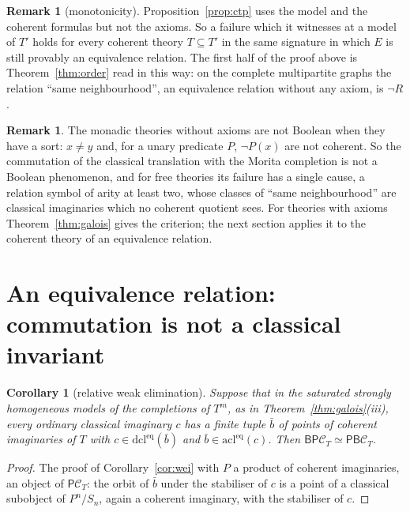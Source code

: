 \documentclass[11pt]{amsart}
\newtheorem{cor}[thm]{Corollary}
\theoremstyle{definition}
\newtheorem{rem}[thm]{Remark}
\newcommand{\PP}{\mathsf P}
\newcommand{\BB}{\mathsf B}
\newcommand{\cC}{\mathcal C}
\begin{document}
\begin{rem}[monotonicity]\label{rem:mono}
Proposition~\ref{prop:ctp} uses the model and the coherent formulas but
not the axioms. So a failure which it witnesses at a model of $T'$
holds for every coherent theory $T\subseteq T'$ in the same signature
in which $E$ is still provably an equivalence relation. The first half
of the proof above is Theorem~\ref{thm:order} read in this way: on the
complete multipartite graphs the relation ``same neighbourhood'', an
equivalence relation without any axiom, is $\neg R$.
\end{rem}

\begin{rem}
The monadic theories without axioms are not Boolean when they have a
sort: $x\ne y$
and, for a unary predicate $P$, $\neg P(x)$ are not coherent. So the commutation of the classical
translation with the Morita completion is not a Boolean phenomenon, and
for free theories its failure has a single cause, a relation symbol of arity
at least two, whose classes of ``same neighbourhood'' are classical imaginaries
which no coherent quotient sees. For theories with axioms
Theorem~\ref{thm:galois} gives the criterion; the next section applies
it to the coherent theory of an equivalence relation.
\end{rem}

\section{An equivalence relation: commutation is not a classical invariant}\label{sec:eq}

\begin{cor}[relative weak elimination]\label{cor:rwei}
Suppose that in the saturated strongly homogeneous models of the
completions of $T^m$, as in Theorem~\ref{thm:galois}(iii), every ordinary
classical imaginary $c$ has a finite tuple $\bar b$ of points of
coherent imaginaries of $T$ with $c\in\mathrm{dcl}^{\mathrm{eq}}(\bar b)$
and $\bar b\in\mathrm{acl}^{\mathrm{eq}}(c)$. Then
$\BB\PP\cC_T\simeq\PP\BB\cC_T$.
\end{cor}
\begin{proof}
The proof of Corollary~\ref{cor:wei} with $P$ a product of coherent
imaginaries, an object of $\PP\cC_T$: the orbit of $\bar b$ under the
stabiliser of $c$ is a point of a classical subobject of $P^n/S_n$,
again a coherent imaginary, with the stabiliser of $c$.
\end{proof}
\end{document}
